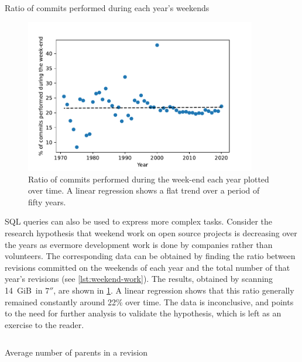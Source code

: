 \begin{listing}
    \inputminted[firstline=3]{sql}{codesamples/graph-dataset/weekend-work.sql}
    \caption{Ratio of commits performed during each year's weekends}%
    \label{lst:weekend-work}
\end{listing}

\begin{figure}
    \centering
    \includegraphics[width=0.9\textwidth]{img/graph-dataset/weekend-work}
    \caption{Ratio of commits performed during the week-end each year plotted
    over time. A linear regression shows a flat trend over a period of fifty
    years.}%
    \label{fig:weekend-work}
\end{figure}


SQL queries can also be used to express more complex tasks.  Consider the
research hypothesis that weekend work on open source projects is decreasing
over the years as evermore development work is done by companies rather than
volunteers.  The corresponding data can be obtained by finding the ratio
between revisions committed on the weekends of each year and the total number
of that year's revisions (see \cref{lst:weekend-work}).
The results, obtained by scanning 14~GiB\ in $7''$, are shown in
\cref{fig:weekend-work}. A linear regression shows that this ratio generally
remained constantly around 22\% over time. The data is inconclusive, and points
to the need for further analysis to validate the hypothesis, which is left as
an exercise to the reader.

\begin{listing}
    \inputminted[firstline=4]{sql}{codesamples/graph-dataset/fork-size.sql}
    \caption{Average number of parents in a revision}%
    \label{lst:fork-size}
\end{listing}

